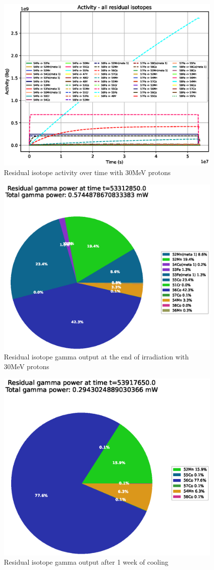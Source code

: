 \begin{figure}[!htb]
\centering
\includegraphics[width=0.7\linewidth]{chapters/activity_code/fe_100dpa/by_isotope/30MeV_all_radioactive_isotopes.eps}
\caption{Residual isotope activity over time with 30MeV protons}
\label{fig:30mev-proton-100dpa-activity}
\end{figure}

\begin{figure}[!htb]
\centering
\includegraphics[width=0.7\linewidth]{chapters/activity_code/fe_100dpa/endofbeam/30MeV_0400_53312850.eps}
\caption{Residual isotope gamma output at the end of irradiation with 30MeV protons}
\label{fig:30mev-proton-100dpa}
\end{figure}

\begin{figure}[!htb]
\centering
\includegraphics[width=0.7\linewidth]{chapters/activity_code/fe_100dpa/endofbeam/30MeV_0500_53917650.eps}
\caption{Residual isotope gamma output after 1 week of cooling}
\label{fig:30mev-proton-100dpa}
\end{figure}



